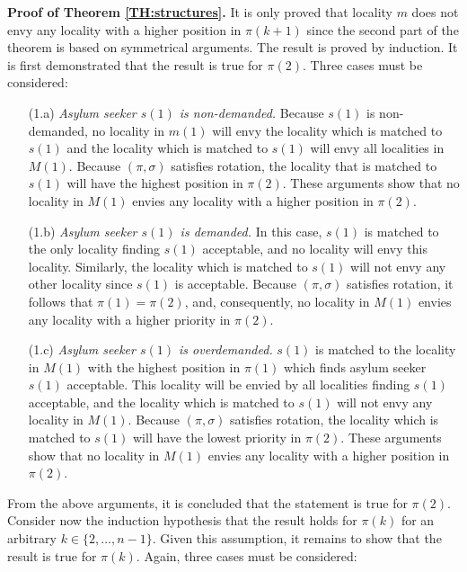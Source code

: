 \documentclass[12pt,fleqn]{article}
\begin{document}
\medskip

\noindent\textbf{Proof of Theorem \ref{TH:structures}.} It is only proved that locality $m$ does not envy any locality with a higher position in $\pi(k+1)$ since the second part of the theorem is based on symmetrical arguments. The result is proved by induction. It is first demonstrated that the result is true for $\pi(2)$. Three cases must be considered:

\begin{itemize}

\item[(1.a)] \emph{Asylum seeker $s(1)$ is non-demanded.} Because $s(1)$ is non-demanded, no locality in $m(1)$ will envy the locality which is matched to $s(1)$ and the locality which is matched to $s(1)$ will envy all localities in $M(1)$. Because $(\pi,\sigma)$ satisfies rotation, the locality that is matched to $s(1)$ will have the highest position in $\pi(2)$. These arguments show that no locality in $M(1)$ envies any locality with a higher position in $\pi(2)$.

\item[(1.b)] \emph{Asylum seeker $s(1)$ is demanded.} In this case, $s(1)$ is matched to the only locality finding $s(1)$ acceptable, and no locality will envy this locality. Similarly, the locality which is matched to $s(1)$ will not envy any other locality since $s(1)$ is acceptable. Because $(\pi,\sigma)$ satisfies rotation, it follows that $\pi(1)=\pi(2)$, and, consequently, no locality in $M(1)$ envies any locality with a higher priority in $\pi(2)$.

\item[(1.c)] \emph{Asylum seeker $s(1)$ is overdemanded.} $s(1)$ is matched to the locality in $M(1)$ with the highest position in $\pi(1)$ which finds asylum seeker $s(1)$ acceptable. This locality will be envied by all localities finding $s(1)$ acceptable, and the locality which is matched to $s(1)$ will not envy any locality in $M(1)$. Because $(\pi,\sigma)$ satisfies rotation, the locality which is matched to $s(1)$ will have the lowest priority in $\pi(2)$. These arguments show that no locality in $M(1)$ envies any locality with a higher position in $\pi(2)$.
\end{itemize}

\noindent From the above arguments, it is concluded that the statement is true for $\pi(2)$. Consider now the induction hypothesis that the result holds for $\pi(k)$ for an arbitrary $k\in \{2,\ldots,n-1\}$. Given this assumption, it remains to show that the result is true for $\pi(k)$. Again, three cases must be considered:
\end{document}
